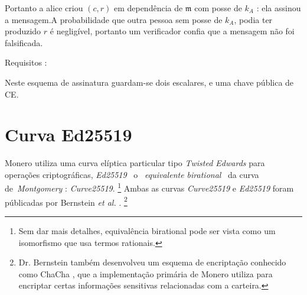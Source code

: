 \begin{enumerate}
Portanto a alice criou $(c,r)$ em dependência de $\mathfrak{m}$ com posse de $k_A$ : 
\newline ela assinou a mensagem.\newline A probabilidade que outra pessoa sem posse de $k_A$, podia ter produzido $r$ é negligível, portanto um verificador confia que a mensagem não foi falsificada. 


Requisitos :

Neste esquema de assinatura guardam-se dois escalares, e uma chave pública de CE.




\section{Curva Ed25519}
\label{Ed25519_section}

Monero utiliza uma curva elíptica particular tipo {\em Twisted Edwards} para operações criptográficas, {\em Ed25519 }\ o \ {\em equivalente birational} \ da curva de\ {\em Montgomery} : {\em Curve25519}.  
\footnote{\label{birational_note}Sem dar mais detalhes, equivalência birational pode ser vista como um isomorfismo que usa termos rationais.} 
Ambas as curvas {\em Curve25519} e {\em Ed25519} foram públicadas por Bernstein {\em et al.} \cite{Bernstein2008, Bernstein2012, Bernstein2007}.
\footnote{Dr. Bernstein também desenvolveu um esquema de encriptação conhecido como ChaCha \cite{Bernstein_chacha,chacha-irtf}, que a implementação primária de Monero utiliza para encriptar  certas informações sensitivas relacionadas com a carteira.}  



\end{enumerate}
